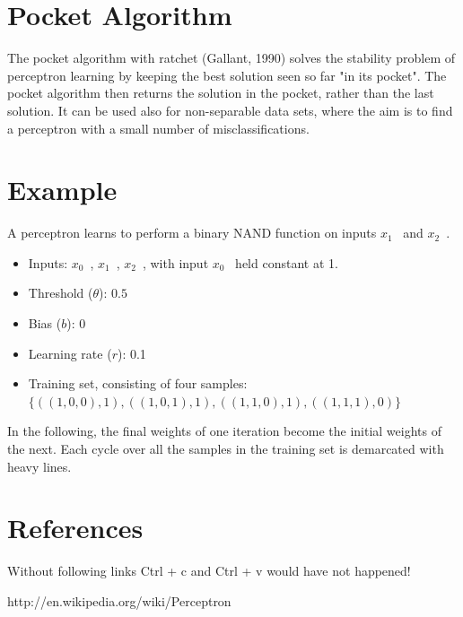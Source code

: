 \documentclass[12pt, right open]{memoir}
\begin{document}
\section{Pocket Algorithm}
The pocket algorithm with ratchet (Gallant, 1990) solves the stability problem of perceptron learning by keeping the best solution seen so far "in its pocket". The pocket algorithm then returns the solution in the pocket, rather than the last solution. It can be used also for non-separable data sets, where the aim is to find a perceptron with a small number of misclassifications.


\section{Example}
A perceptron learns to perform a binary NAND function on inputs $x_1$ \, and $x_2$ \,.

\begin{itemize}
\item Inputs: $x_0$ \,, $x_1$ \,, $x_2$ \,, with input $x_0$ \, held constant at 1.
\item Threshold ($\theta$): $0.5$
\item Bias ($b$): 0
\item Learning rate ($r$): 0.1
\item Training set, consisting of four samples: $\{((1, 0, 0), 1), ((1, 0, 1), 1), ((1, 1, 0), 1), ((1, 1, 1), 0)\}$ \,
\end{itemize}


In the following, the final weights of one iteration become the initial weights of the next. Each cycle over all the samples in the training set is demarcated with heavy lines.


\section{References}
Without following links Ctrl + c and Ctrl + v would have not happened!

http://en.wikipedia.org/wiki/Perceptron
\end{document}
